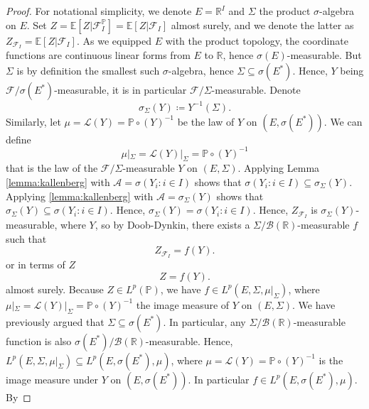 \documentclass[11pt,a4paper,twoside,openany]{report}
\numberwithin{equation}{section}
\theoremstyle{plain} %
\theoremstyle{definition} %
\theoremstyle{remark} %
\begin{document}
\begin{proof}
    For notational simplicity, we denote \(E=\mathbb{R}^I\) and \(\Sigma\) the product \(\sigma\)-algebra on \(E\).
    Set \(Z=\mathbb{E}[Z|\mathcal{F}_I^{\mathbb{P}}]=\mathbb{E}[Z|\mathcal{F}_I]\) almost surely, and we denote the latter as \(Z_{\mathcal{F}_I}=\mathbb{E}[Z|\mathcal{F}_I]\). 
    As we equipped \(E\) with the product topology, the coordinate functions are continuous linear forms from \(E\) to \(\mathbb{R}\), hence \(\sigma(E)\)-measurable. But \(\Sigma\) is by definition the smallest such \(\sigma\)-algebra, hence \(\Sigma\subseteq\sigma(E^*)\). Hence, 
    \(Y\) being \(\mathcal{F}/\sigma(E^*)\)-measurable, it is in particular \(\mathcal{F}/\Sigma\)-measurable. Denote 
    \begin{equation*}
        \sigma_{\Sigma}(Y)\coloneqq Y^{-1}(\Sigma).
    \end{equation*}
 Similarly, let \(\mu=\mathcal{L}(Y)=\mathbb{P}\circ(Y)^{-1}\) be the law of \(Y\) on \((E,\sigma(E^*))\). We can define 
    \begin{equation*}
        \mu|_{\Sigma}=\mathcal{L}(Y)|_{\Sigma}=\mathbb{P}\circ(Y)^{-1}
    \end{equation*}
    that is the law of the \(\mathcal{F}/\Sigma\)-measurable \(Y\) on \((E,\Sigma)\).
    Applying Lemma \ref{lemma:kallenberg} with \(\mathcal{A}=\sigma(Y_i:i\in I)\) shows that \(\sigma(Y_i:i\in I)\subseteq\sigma_{\Sigma}(Y)\). Applying \ref{lemma:kallenberg} with \(\mathcal{A}=\sigma_{\Sigma}(Y)\) shows that \(\sigma_{\Sigma}(Y)\subseteq\sigma(Y_i:i\in I)\). Hence, \(\sigma_{\Sigma}(Y)=\sigma(Y_i:i\in I)\). Hence, \(Z_{\mathcal{F}_I}\) is \(\sigma_{\Sigma}(Y)\)-measurable, where \(Y\), so by Doob-Dynkin, there exists a \(\Sigma/\mathcal{B}(\mathbb{R})\)-measurable \(f\) such that 
    \begin{equation*}
        Z_{\mathcal{F}_I} = f(Y).
    \end{equation*}
    or in terms of \(Z\)
    \begin{equation*}
        Z = f(Y).
    \end{equation*}
    almost surely.  
 Because \(Z\in L^p(\mathbb{P})\), we have \(f\in L^p(E,\Sigma,\mu|_{\Sigma})\), where \(\mu|_{\Sigma}=\mathcal{L}(Y)|_{\Sigma}=\mathbb{P}\circ(Y)^{-1}\) the image measure of \(Y\) on \((E,\Sigma)\). We have previously argued that \(\Sigma\subseteq\sigma(E^*)\). In particular, any \(\Sigma/\mathcal{B}(\mathbb{R})\)-measurable function is also \(\sigma(E^*)/\mathcal{B}(\mathbb{R})\)-measurable. Hence,  \(L^p(E,\Sigma,\mu|_{\Sigma})\subseteq L^p(E,\sigma(E^*),\mu)\), where \(\mu=\mathcal{L}(Y)=\mathbb{P}\circ(Y)^{-1}\) is the image measure under \(Y\) on \((E,\sigma(E^*))\). In particular \(f\in L^p(E,\sigma(E^*),\mu)\). By

\end{proof}
\end{document}
